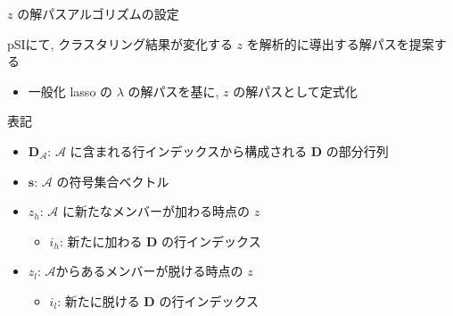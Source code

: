 \documentclass[dvipdfmx, 10pt]{beamer}
\begin{document}

\begin{frame}{$z$ の解パスアルゴリズムの設定}


    pSIにて, クラスタリング結果が変化する $z$ を解析的に導出する解パスを提案する
    \begin{itemize}
        \item 一般化 lasso の $\lambda$ の解パスを基に, $z$ の解パスとして定式化
    \end{itemize}

    表記
    \begin{itemize}
        \item $\bm{D}_{\mathcal{A}}$: $\mathcal{A}$ に含まれる行インデックスから構成される $\bm{D}$ の部分行列
        \item $\bm{s}$: $\mathcal{A}$ の符号集合ベクトル
        \item $z_h$: $\mathcal{A}$ に新たなメンバーが加わる時点の $z$
        \begin{itemize}
            \item $i_h$: 新たに加わる $\bm{D}$ の行インデックス
        \end{itemize} 
        \item $z_l$: $\mathcal{A}$からあるメンバーが脱ける時点の $z$
        \begin{itemize}
            \item $i_l$: 新たに脱ける $\bm{D}$ の行インデックス
        \end{itemize}
    \end{itemize}

\end{frame}
  
\end{document}
